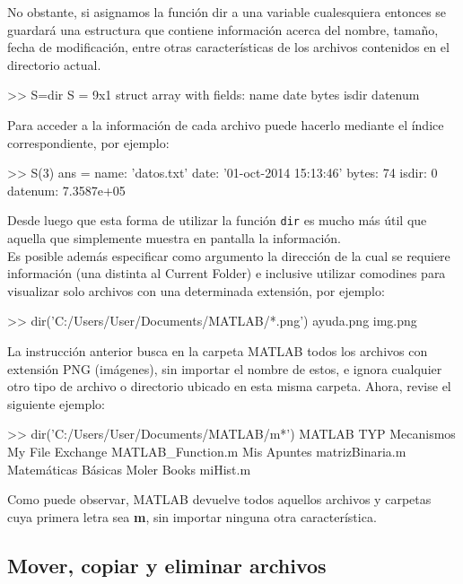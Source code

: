 No obstante, si asignamos la función dir a una variable cualesquiera
entonces se guardará una estructura que contiene información acerca del
nombre, tamaño, fecha de modificación, entre otras características de
los archivos contenidos en el directorio actual.

\begin{matlab}
>> S=dir
S = 
9x1 struct array with fields:
    name
    date
    bytes
    isdir
    datenum
\end{matlab}

Para acceder a la información de cada archivo puede hacerlo mediante el
índice correspondiente, por ejemplo:

\begin{matlab}
>> S(3)
ans = 
       name: 'datos.txt'
       date: '01-oct-2014 15:13:46'
      bytes: 74
      isdir: 0
    datenum: 7.3587e+05
\end{matlab}

Desde luego que esta forma de utilizar la función \texttt{dir} es mucho
más útil que aquella que simplemente muestra en pantalla la información. \\

Es posible además especificar como argumento la dirección de la cual se
requiere información (una distinta al Current Folder) e inclusive
utilizar comodines para visualizar solo archivos con una determinada
extensión, por ejemplo:

\begin{matlab}
>> dir('C:/Users/User/Documents/MATLAB/*.png')
ayuda.png  img.png 
\end{matlab}

La instrucción anterior busca en la carpeta MATLAB todos los archivos
con extensión PNG (imágenes), sin importar el nombre de estos, e ignora
cualquier otro tipo de archivo o directorio ubicado en esta misma
carpeta. Ahora, revise el siguiente ejemplo:

\begin{matlab}
>> dir('C:/Users/User/Documents/MATLAB/m*')
MATLAB TYP           Mecanismos           My File Exchange     
MATLAB_Function.m    Mis Apuntes          matrizBinaria.m      
Matemáticas Básicas  Moler Books          miHist.m       
\end{matlab}

Como puede observar, MATLAB devuelve todos aquellos archivos y carpetas
cuya primera letra sea \textbf{m}, sin importar ninguna otra
característica.

\subsection{Mover, copiar y eliminar
archivos}\label{mover-copiar-y-eliminar-archivos}

